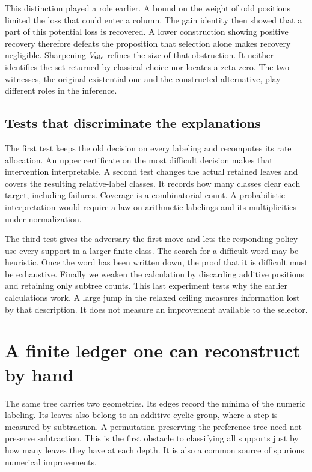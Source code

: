 \documentclass[12pt,letterpaper]{article}
\begin{document}
This distinction played a role earlier. A bound on the weight of odd positions limited the loss that could enter a column. The gain identity then showed that a part of this potential loss is recovered. A lower construction showing positive recovery therefore defeats the proposition that selection alone makes recovery negligible. Sharpening \(V_{\rm tile}\) refines the size of that obstruction. It neither identifies the set returned by classical choice nor locates a zeta zero. The two witnesses, the original existential one and the constructed alternative, play different roles in the inference.

\subsection{Tests that discriminate the explanations}
The first test keeps the old decision on every labeling and recomputes its rate allocation. An upper certificate on the most difficult decision makes that intervention interpretable. A second test changes the actual retained leaves and covers the resulting relative-label classes. It records how many classes clear each target, including failures. Coverage is a combinatorial count. A probabilistic interpretation would require a law on arithmetic labelings and its multiplicities under normalization.

The third test gives the adversary the first move and lets the responding policy use every support in a larger finite class. The search for a difficult word may be heuristic. Once the word has been written down, the proof that it is difficult must be exhaustive. Finally we weaken the calculation by discarding additive positions and retaining only subtree counts. This last experiment tests why the earlier calculations work. A large jump in the relaxed ceiling measures information lost by that description. It does not measure an improvement available to the selector.
\section{A finite ledger one can reconstruct by hand}
\label{sec:ledger}
The same tree carries two geometries. Its edges record the minima of the numeric labeling. Its leaves also belong to an additive cyclic group, where a step is measured by subtraction. A permutation preserving the preference tree need not preserve subtraction. This is the first obstacle to classifying all supports just by how many leaves they have at each depth. It is also a common source of spurious numerical improvements.
\end{document}
